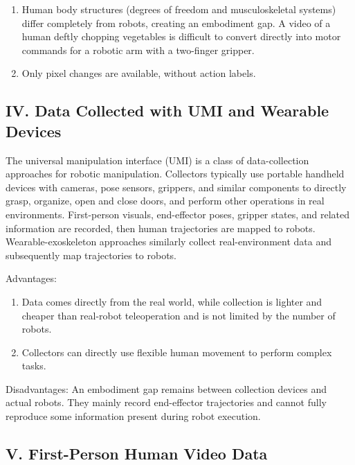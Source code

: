 \begin{enumerate}
\def\labelenumi{\arabic{enumi}.}
\item
  Human body structures (degrees of freedom and musculoskeletal systems) differ completely from robots, creating an embodiment gap. A video of a human deftly chopping vegetables is difficult to convert directly into motor commands for a robotic arm with a two-finger gripper.
\item
  Only pixel changes are available, without action labels.
\end{enumerate}

\hypertarget{iv.-data-collected-with-umi-and-wearable-devices}{%
\subsection{IV. Data Collected with UMI and Wearable Devices}\label{iv.-data-collected-with-umi-and-wearable-devices}}

The universal manipulation interface (UMI) is a class of data-collection approaches for robotic manipulation. Collectors typically use portable handheld devices with cameras, pose sensors, grippers, and similar components to directly grasp, organize, open and close doors, and perform other operations in real environments. First-person visuals, end-effector poses, gripper states, and related information are recorded, then human trajectories are mapped to robots. Wearable-exoskeleton approaches similarly collect real-environment data and subsequently map trajectories to robots.

Advantages:

\begin{enumerate}
\def\labelenumi{\arabic{enumi}.}
\item
  Data comes directly from the real world, while collection is lighter and cheaper than real-robot teleoperation and is not limited by the number of robots.
\item
  Collectors can directly use flexible human movement to perform complex tasks.
\end{enumerate}

Disadvantages: An embodiment gap remains between collection devices and actual robots. They mainly record end-effector trajectories and cannot fully reproduce some information present during robot execution.

\hypertarget{v.-first-person-human-video-data}{%
\subsection{V. First-Person Human Video Data}\label{v.-first-person-human-video-data}}

